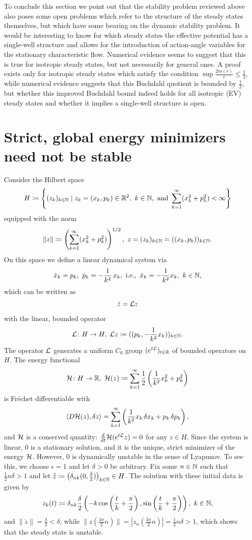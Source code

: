 \documentclass[11pt]{article}
\begin{document}
To conclude this section we point out that the stability problem reviewed
above also poses some open problems which refer to the structure of
the steady states themselves, but which have some bearing on the dynamic
stability problem. It would be interesting to know for which steady states
the effective potential has a single-well structure and allows for the
introduction of action-angle variables for the stationary characteristic
flow. Numerical evidence seems to suggest that this is true for
isotropic steady states, but not necessarily for general ones.
A proof exists only for isotropic steady states which satisfy the
condition
$\sup \frac{2 m(r)}{r} \leq \frac{1}{3}$, while numerical evidence
suggests that this Buchdahl quotient is bounded by $\frac{1}{2}$,
but whether this improved Buchdahl bound indeed holds for all isotropic
(EV) steady states and whether it implies a single-well structure is
open.
%
%
\section{Strict, global energy minimizers need not be stable}
\label{theexample}
\setcounter{equation}{0}
%
Consider the Hilbert space
\[
H \coloneqq \left\{(z_k)_{k\in \mathbb N} \mid
z_k = (x_k,p_k)\in \mathbb R^2,\ k\in \mathbb N,\ \mbox{and}\
\sum_{k=1}^\infty (x_k^2 + p_k^2) < \infty \right\}
\]
equipped with the norm
\[
\| z\| \coloneqq \left(\sum_{k=1}^\infty (x_k^2 + p_k^2)\right)^{1/2},\
z=(z_k)_{k\in \mathbb N} = ((x_k,p_k))_{k\in \mathbb N}.
\]
On this space we define a linear dynamical system via
\[
\dot x_k = p_k,\ \dot p_k = -\frac{1}{k^2}\, x_k,
\ \mbox{i.e.},\ \ddot x_k =  -\frac{1}{k^2} x_k,\ k\in \mathbb N,
\]
which can be written as
\begin{equation}\label{exsys}
  \dot z = {\cal L} z
\end{equation}
with the linear, bounded operator
\[
{\cal L} \colon H \to H,\ {\cal L} z \coloneqq ((p_k,-\frac{1}{k^2} x_k))_{k\in \mathbb N}.
\]
The operator ${\cal L}$ generates a uniform $C_0$ group
$(e^{t{\cal L}})_{t\in \mathbb R}$ of bounded operators on $H$.
The energy functional
\[
{\cal H} \colon H \to \mathbb R,\
{\cal H}(z)\coloneqq \sum_{k=1}^\infty \frac{1}{2}
\left(\frac{1}{k^2}x_k^2 + p_k^2\right)
\]
is Fr\'{e}chet differentiable with
\[
\langle D{\cal H}(z),\delta z\rangle =
\sum_{k=1}^\infty \left(\frac{1}{k^2}x_k \,\delta x_k + p_k \,\delta p_k\right),
\]
and ${\cal H}$ is a conserved quantity: $\frac{d}{dt} {\cal H} (e^{t{\cal L}} z) =0$
for any $z\in H$. Since the system is linear, $0$ is a stationary solution,
and it is the unique, strict minimizer of the energy ${\cal H}$. However,
$0$ is dynamically unstable in the sense of Lyapunov. To see this, we
choose $\epsilon =1$ and let $\delta>0$ be arbitrary.
Fix some $n\in \mathbb N$ such that $\frac{1}{2} n \delta > 1$ and let
$\mathring z \coloneqq \left(\delta_{nk}(0,\frac{\delta}{2})\right)_{k\in \mathbb N}
\in H$.
The solution with these initial data is given by
\[
z_k (t) \coloneqq \delta_{nk}\frac{\delta}{2}
\left(-k \cos\left(\frac{t}{k}+\frac{\pi}{2}\right),
\sin\left(\frac{t}{k}+\frac{\pi}{2}\right)\right),\ k\in \mathbb N,
\]
and $\|\mathring z\| = \frac{\delta}{2} < \delta$, while
$\|z(\frac{3\pi}{2} n)\| = |z_n(\frac{3\pi}{2} n)| =\frac{1}{2} n \delta > 1$,
which shows that the steady state is unstable.
\end{document}
